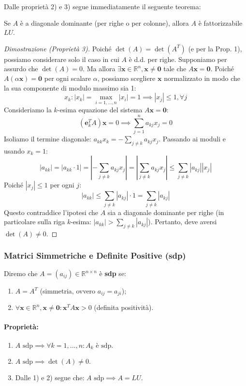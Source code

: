 Dalle proprietà 2) e 3) segue immediatamente il seguente teorema:
\begin{teorema}
Se $A$ è a diagonale dominante (per righe o per colonne), allora $A$ è fattorizzabile $LU$.
\end{teorema}
\begin{proof}[Dimostrazione (Proprietà 3)]
Poiché $\det(A) = \det(A^T)$ (e per la Prop. 1), possiamo considerare solo il caso in cui $A$ è d.d. per righe. Supponiamo per assurdo che $\det(A)=0$. Ma allora $\exists \mathbf{x} \in \mathbb{R}^n, \mathbf{x} \neq \mathbf{0}$ tale che $A\mathbf{x} = \mathbf{0}$.
Poiché $A(\alpha \mathbf{x}) = \mathbf{0}$ per ogni scalare $\alpha$, possiamo scegliere $\mathbf{x}$ normalizzato in modo che la sua componente di modulo massimo sia 1:
$$ x_k : |x_k| = \max_{i=1,\dots,n} |x_i| = 1 \implies |x_j| \le 1, \forall j $$
Consideriamo la $k$-esima equazione del sistema $A\mathbf{x} = \mathbf{0}$:
$$ (\mathbf{e}_k^T A) \mathbf{x} = 0 \implies \sum_{j=1}^n a_{kj} x_j = 0 $$
Isoliamo il termine diagonale: $a_{kk} x_k = - \sum_{j \neq k} a_{kj} x_j$. Passando ai moduli e usando $x_k=1$:
$$ |a_{kk}| = |a_{kk} \cdot 1| = \left| - \sum_{j \neq k} a_{kj} x_j \right| = \left| \sum_{j \neq k} a_{kj} x_j \right| \le \sum_{j \neq k} |a_{kj}| |x_j| $$
Poiché $|x_j| \le 1$ per ogni $j$:
$$ |a_{kk}| \le \sum_{j \neq k} |a_{kj}| \cdot 1 = \sum_{j \neq k} |a_{kj}| $$
Questo contraddice l'ipotesi che $A$ sia a diagonale dominante per righe (in particolare sulla riga $k$-esima: $|a_{kk}| > \sum_{j \neq k} |a_{kj}|$). Pertanto, deve aversi $\det(A) \neq 0$.
\end{proof}

\subsubsection{Matrici Simmetriche e Definite Positive (sdp)}
\begin{definition}
Diremo che $A=(a_{ij}) \in \mathbb{R}^{n \times n}$ è \textbf{sdp} se:
\begin{enumerate}
    \item $A = A^T$ (simmetria, ovvero $a_{ij} = a_{ji}$);
    \item $\forall \mathbf{x} \in \mathbb{R}^n, \mathbf{x} \neq \mathbf{0} : \mathbf{x}^T A \mathbf{x} > 0$ (definita positività).
\end{enumerate}
\end{definition}

\paragraph{Proprietà:}
\begin{enumerate}
    \item $A \text{ sdp} \implies \forall k=1, \dots, n : A_k \text{ è sdp}$.
    \item $A \text{ sdp} \implies \det(A) \neq 0$.
    \item Dalle 1) e 2) segue che: $A \text{ sdp} \implies A = LU$.
\end{enumerate}

